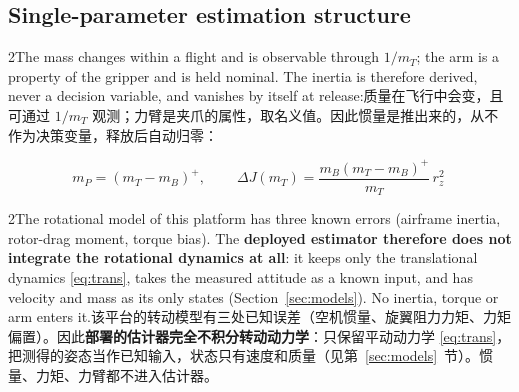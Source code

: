 \documentclass[10pt,a4paper]{article}
\numberwithin{equation}{section}
\newcommand{\dJ}{\Delta J}
\newcommand{\mB}{m_B}
\newcommand{\mP}{m_P}
\newcommand{\mT}{m_T}
\newcommand{\pair}[2]{\begin{paracol}{2}#1\switchcolumn #2\end{paracol}}
\newcommand{\bsub}[2]{\needspace{8\baselineskip}\subsection{#1\quad{\normalfont #2}}}
\begin{document}
\bsub{Single-parameter estimation structure}{单参数估计结构}
\pair{The mass changes within a flight and is observable through $1/\mT$; the
arm is a property of the gripper and is held nominal. The inertia is therefore
derived, never a decision variable, and vanishes by itself at release:}
{质量在飞行中会变，且可通过 $1/\mT$ 观测；力臂是夹爪的属性，取名义值。因此惯量是推出来的，从不作为决策变量，释放后自动归零：}
\begin{equation}
\mP=(\mT-\mB)^+,\qquad
\boxed{\ \dJ(\mT)=\frac{\mB(\mT-\mB)^+}{\mT}\,r_z^2\ }
\label{eq:dJofm}
\end{equation}
\pair{The rotational model of this platform has three known errors (airframe
inertia, rotor-drag moment, torque bias). The \textbf{deployed estimator
therefore does not integrate the rotational dynamics at all}: it keeps only the
translational dynamics \eqref{eq:trans}, takes the measured attitude as a known
input, and has velocity and mass as its only states
(Section~\ref{sec:models}). No inertia, torque or arm enters it.}
{该平台的转动模型有三处已知误差（空机惯量、旋翼阻力力矩、力矩偏置）。因此\textbf{部署的估计器完全不积分转动动力学}：只保留平动动力学 \eqref{eq:trans}，把测得的姿态当作已知输入，状态只有速度和质量（见第~\ref{sec:models}~节）。惯量、力矩、力臂都不进入估计器。}
\end{document}
